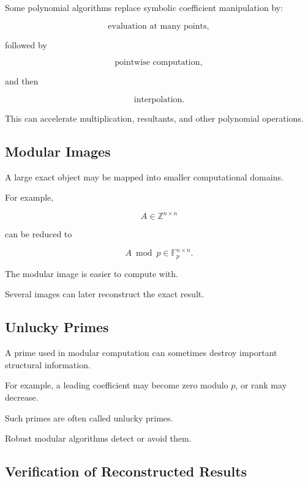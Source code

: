 Some polynomial algorithms replace symbolic coefficient manipulation by:

\[
\boxed{
\text{evaluation at many points},
}
\]

followed by

\[
\boxed{
\text{pointwise computation},
}
\]

and then

\[
\boxed{
\text{interpolation}.
}
\]

This can accelerate multiplication, resultants, and other polynomial
operations.

\subsection{Modular Images}
\label{subsec:modular-images}

A large exact object may be mapped into smaller computational domains.

For example,

\[
A
\in
\mathbb{Z}^{n\times n}
\]

can be reduced to

\[
\boxed{
A\bmod p
\in
\mathbb{F}_p^{n\times n}.
}
\]

The modular image is easier to compute with.

Several images can later reconstruct the exact result.

\subsection{Unlucky Primes}
\label{subsec:unlucky-primes}

A prime used in modular computation can sometimes destroy important
structural information.

For example, a leading coefficient may become zero modulo \(p\), or rank
may decrease.

Such primes are often called unlucky primes.

Robust modular algorithms detect or avoid them.

\subsection{Verification of Reconstructed Results}
\label{subsec:verification-reconstructed-results}

